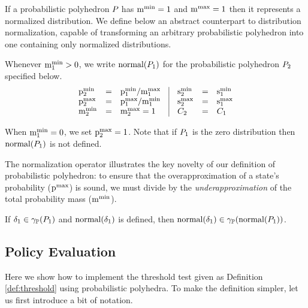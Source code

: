 If a probabilistic polyhedron $P_{}$ has $\mathrm{m}^\mathrm{min}_{} = 1$ and $\mathrm{m}^\mathrm{max}_{} =
1$ then it represents a normalized distribution.  We define below an
abstract counterpart to distribution normalization, capable of
transforming an arbitrary probabilistic polyhedron into one containing
only normalized distributions.

\begin{definition}
Whenever $ \mathrm{m}^\mathrm{min}_{1} > 0 $, we write $\text{normal}(P_{1})$ for the
probabilistic polyhedron $P_{2}$ specified below.
\[
\begin{array}{lcl@{\hspace{0.35cm}}|@{\hspace{0.35cm}}lcl}
\pmin{2} &=& \pmin{1} / \mmax{1} &
\smin{2} &=& \smin{1}\\
\pmax{2} &=& \pmax{1} / \mmin{1} &
\smax{2} &=&\smax{1} \\
\mmin{2} &=& \mmax{2} = 1 & \getpoly{2} &=& \getpoly{1} \\
\end{array}
\]
\end{definition}

When $ \mathrm{m}^\mathrm{min}_{1} = 0 $, we set $\mathrm{p}^\mathrm{max}_{2} = 1$.  Note that if $P_{1}$
is the zero distribution then $\text{normal}(P_{1})$ is not defined.

The normalization operator illustrates the key novelty of our
definition of probabilistic polyhedron: to ensure that the
overapproximation of a state's probability ($\mathrm{p}^\mathrm{max}_{}$) is sound, we
must divide by the \emph{underapproximation} of the total probability
mass ($\mathrm{m}^\mathrm{min}_{}$).

\begin{lemma}
\label{lem:pp:norm}
If $\delta_1 \in \gamma_{\mathbb{P}}(P_{1})$ and $\text{normal}(\delta_1)$ is defined, then $\text{normal}(\delta_1) \in \gamma_{\mathbb{P}}(\text{normal}(P_{1}))$.
\end{lemma}

\subsection{Policy Evaluation}

\noindent Here we show how to implement the threshold test given as
Definition \ref{def:threshold} using probabilistic polyhedra. To make
the definition simpler, let us first introduce a bit of notation.

